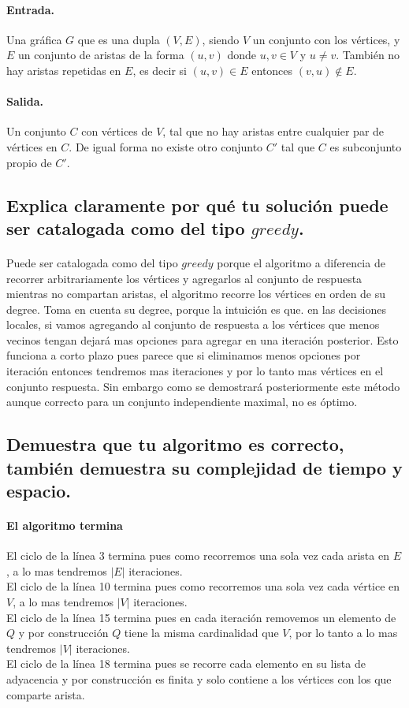 \documentclass[12pt]{article}
\begin{document}
\paragraph{Entrada.}Una gráfica $G$ que es una dupla $(V, E)$, siendo $V$ un conjunto con los vértices, y $E$ un conjunto de aristas de la forma $(u, v)$ donde $u, v\in V$ y $u \neq v$. También no hay aristas repetidas en $E$, es decir si $(u, v) \in E$ entonces $(v, u) \notin E$.
\paragraph{Salida.} Un conjunto $C$ con vértices de $V$, tal que no hay aristas entre cualquier par de vértices en $C$. De igual forma no existe otro conjunto $C'$ tal que $C$ es subconjunto propio de $C'$.
\subsection{Explica claramente por qué tu solución puede ser catalogada como del tipo $greedy$.}
\paragraph{}Puede ser catalogada como del tipo $greedy$ porque el algoritmo a diferencia de recorrer arbitrariamente los vértices y agregarlos al conjunto de respuesta mientras no compartan aristas, el algoritmo recorre los vértices en orden de su degree. Toma en cuenta su degree, porque la intuición es que. en las decisiones locales, si vamos agregando al conjunto de respuesta a los vértices que menos vecinos tengan dejará mas opciones para agregar en una iteración posterior. Esto funciona a corto plazo pues parece que si eliminamos menos opciones por iteración entonces tendremos mas iteraciones y por lo tanto mas vértices en el conjunto respuesta. Sin embargo como se demostrará posteriormente este método aunque correcto para un conjunto independiente maximal, no es óptimo.\\
\subsection{Demuestra que tu algoritmo es correcto, también demuestra su complejidad de tiempo y espacio.}
\paragraph{El algoritmo termina}
El ciclo de la línea 3 termina pues como recorremos una sola vez cada arista en $E$, a lo mas tendremos $|E|$ iteraciones.\\
El ciclo de la línea 10 termina pues como recorremos una sola vez cada vértice en $V$, a lo mas tendremos $|V|$ iteraciones.\\
El ciclo de la línea 15 termina pues en cada iteración removemos un elemento de $Q$ y por construcción $Q$ tiene la misma cardinalidad que $V$, por lo tanto a lo mas tendremos $|V|$ iteraciones.\\
El ciclo de la línea 18 termina pues se recorre cada elemento en su lista de adyacencia y por construcción es finita y solo contiene a los vértices con los que comparte arista.\\
\end{document}
